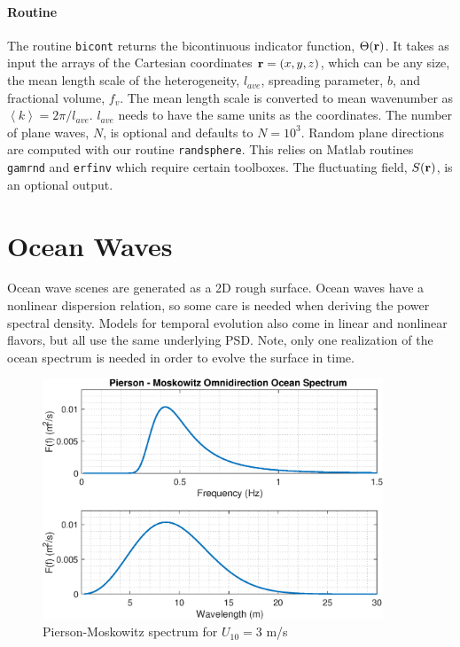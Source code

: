 \paragraph{Routine}

The routine \texttt{bicont} returns the bicontinuous indicator function, $\Theta(\mathbf{r})$. It takes as input the arrays of the Cartesian coordinates $\mathbf{r} = (x,y,z)$, which can be any size, the mean length scale of the heterogeneity, $l_{ave}$, spreading parameter, $b$, and fractional volume, $f_v$. The mean length scale is converted to mean wavenumber as $\left<k\right> = 2\pi/l_{ave}$. $l_{ave}$ needs to have the same units as the coordinates. The number of plane waves, $N$, is optional and defaults to $N=10^3$. Random plane directions are computed with our routine \texttt{randsphere}. This relies on Matlab routines \texttt{gamrnd} and \texttt{erfinv} which require certain toolboxes. The fluctuating field, $S(\mathbf{r})$, is an optional output. 


\clearpage
{\footnotesize
{}
}




\newpage

\section{Ocean Waves}

Ocean wave scenes are generated as a 2D rough surface. Ocean waves have a nonlinear dispersion relation, so some care is needed when deriving the power spectral density. Models for temporal evolution also come in linear and nonlinear flavors, but all use the same underlying PSD. Note, only one realization of the ocean spectrum is needed in order to evolve the surface in time.
  
\begin{figure}[h] 
   \centering
   \includegraphics[width=4in]{RandomObjects/Figures/pmspectrum} 
   \caption{Pierson-Moskowitz spectrum for $U_{10} = 3$ m/s}
\end{figure}

